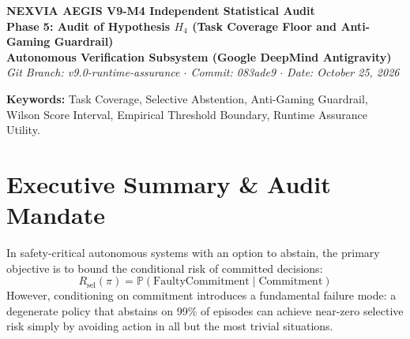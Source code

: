 \documentclass[10pt,a4paper]{article}
\begin{document}
\begin{center}
    {\LARGE \textbf{NEXVIA AEGIS V9-M4 Independent Statistical Audit}}\\[6pt]
    {\Large \textbf{Phase 5: Audit of Hypothesis $H_4$ (Task Coverage Floor and Anti-Gaming Guardrail)}}\\[10pt]
    \textbf{Autonomous Verification Subsystem (Google DeepMind Antigravity)}\\
    \textit{Git Branch: v9.0-runtime-assurance \quad $\cdot$ \quad Commit: 083ade9 \quad $\cdot$ \quad Date: October 25, 2026}\\[12pt]
\end{center}

\begin{abstract}
\noindent This audit report investigates the statistical design and implementation of Hypothesis $H_4$ (Task Coverage Floor Precondition) within the NEXVIA AEGIS V9-M4 confirmatory evaluation harness. In selective classification and certified runtime assurance, selective risk can be trivially minimized by policies that abstain excessively. Hypothesis $H_4$ establishes an operational utility guardrail requiring sample coverage $\hat{C} = M / N \ge C_{\min} = 0.35$ on the uniform mixture holdout $\mathcal{D}_{\mathrm{test}}^{\mathrm{mix}}$ ($N = 1,440$). We audit whether the decision rule operates on the empirical point estimate or an inferential lower confidence bound, analyze exact boundary behavior at $M \in \{503, 504, 505\}$, examine the accompanying two-sided Wilson score confidence interval, and evaluate the anti-gaming classification logic. We verify that the implementation adheres strictly to the preregistered protocol, properly distinguishing an empirical operational precondition from a population-level coverage guarantee.
\end{abstract}

\vspace{6pt}
\noindent \textbf{Keywords:} Task Coverage, Selective Abstention, Anti-Gaming Guardrail, Wilson Score Interval, Empirical Threshold Boundary, Runtime Assurance Utility.

\section{Executive Summary \& Audit Mandate}
In safety-critical autonomous systems with an option to abstain, the primary objective is to bound the conditional risk of committed decisions:
\begin{equation}
R_{\mathrm{sel}}(\pi) = \mathbb{P}(\mathrm{FaultyCommitment} \mid \mathrm{Commitment})
\end{equation}
However, conditioning on commitment introduces a fundamental failure mode: a degenerate policy that abstains on 99\% of episodes can achieve near-zero selective risk simply by avoiding action in all but the most trivial situations. 
\end{document}
